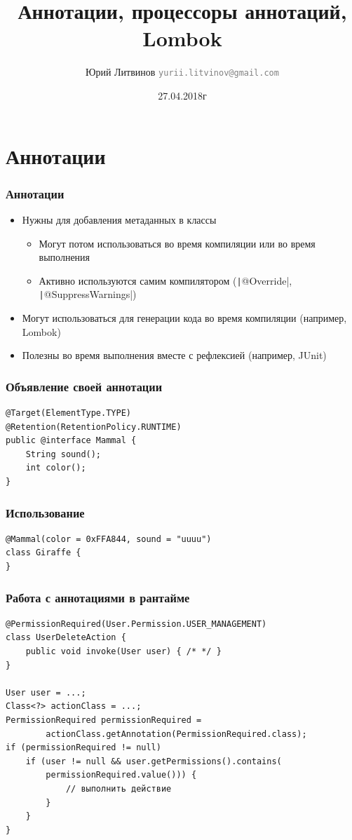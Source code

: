 \documentclass[xetex,mathserif,serif]{beamer}
\title{Аннотации, процессоры аннотаций, Lombok}
\author[Юрий Литвинов]{Юрий Литвинов \newline \textcolor{gray}{\small\texttt{yurii.litvinov@gmail.com}}}
\date{27.04.2018г}
\begin{document}
	
	\frame{\titlepage}

	\section{Аннотации}

	\begin{frame}
		\frametitle{Аннотации}
		\begin{itemize}
			\item Нужны для добавления метаданных в классы
			\begin{itemize}
				\item Могут потом использоваться во время компиляции или во время выполнения
				\item Активно используются самим компилятором (\texttt|@Override|, \texttt|@SuppressWarnings|)
			\end{itemize}
			\item Могут использоваться для генерации кода во время компиляции (например, Lombok)
			\item Полезны во время выполнения вместе с рефлексией (например, JUnit)
		\end{itemize}
	\end{frame}

	\begin{frame}[fragile]
		\frametitle{Объявление своей аннотации}
		\begin{verbatim}
@Target(ElementType.TYPE)
@Retention(RetentionPolicy.RUNTIME)
public @interface Mammal {
    String sound();
    int color();
}
		\end{verbatim}
	\end{frame}

	\begin{frame}[fragile]
		\frametitle{Использование}
		\begin{verbatim}
@Mammal(color = 0xFFA844, sound = "uuuu")
class Giraffe {
}
		\end{verbatim}
	\end{frame}

	\begin{frame}[fragile]
		\frametitle{Работа с аннотациями в рантайме}
		\begin{verbatim}
@PermissionRequired(User.Permission.USER_MANAGEMENT)
class UserDeleteAction {
    public void invoke(User user) { /* */ }
}

User user = ...;
Class<?> actionClass = ...;
PermissionRequired permissionRequired =
        actionClass.getAnnotation(PermissionRequired.class);
if (permissionRequired != null)
    if (user != null && user.getPermissions().contains(
        permissionRequired.value())) {
            // выполнить действие
        }
    }
}
		\end{verbatim}
	\end{frame}
\end{document}
